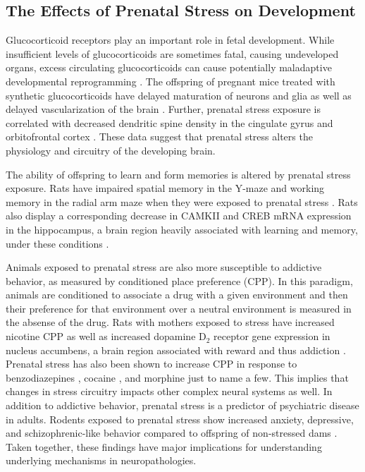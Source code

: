 \documentclass[12pt,twoside]{reedthesis}
\begin{document}
\subsection{The Effects of Prenatal Stress on Development}
Glucocorticoid receptors play an important role in fetal development. While
insufficient levels of glucocorticoids are sometimes fatal, causing undeveloped organs,
excess circulating glucocorticoids can cause potentially maladaptive developmental
reprogramming \citep{2017Nrid}. The offspring of pregnant mice treated with synthetic glucocorticoids
 have delayed maturation of neurons and glia as well as delayed vascularization
 of the brain \citep{gravanis_hormones_2011}. Further, prenatal stress exposure is correlated with
 decreased dendritic spine density in the cingulate gyrus and orbitofrontal
 cortex \citep{murmu_changes_2006}. These data suggest that prenatal stress alters the
 physiology and circuitry of the developing brain.

 The ability of offspring to learn and form memories is altered by prenatal
 stress exposure. Rats have impaired spatial memory in the Y-maze and
 working memory in the radial arm maze when they were exposed to prenatal stress
 \citep{vallee_long-term_1999}. Rats also display a corresponding
 decrease in CAMKII and CREB mRNA expression in the hippocampus, a brain region
 heavily associated with learning and memory, under these
 conditions \citep{sun_prenatal_2017}. 

 Animals exposed to prenatal stress are also more susceptible to addictive
 behavior, as measured by conditioned place preference (CPP). In this paradigm,
 animals are conditioned to associate a drug with a given environment and then
 their preference for that environment over a neutral environment is measured in
 the absense of the drug.
 Rats with mothers exposed to stress have increased nicotine CPP as well as increased dopamine D$_2$ receptor gene expression
 in nucleus accumbens, a brain region associated with reward and thus addiction \citep{said_prenatal_2015}. Prenatal stress has also been shown to
 increase CPP in response to benzodiazepines \citep{lakehayli_prenatal_2015}, cocaine
 \citep{pastor_prenatal_2018}, and morphine \citep{vey_stress_2016} just to name
 a few. This implies that changes in stress circuitry impacts other complex
 neural systems as well. In addition to addictive behavior, prenatal stress is a predictor of psychiatric disease in adults.
 Rodents exposed to prenatal stress show increased anxiety, depressive, and
 schizophrenic-like behavior compared to offspring of non-stressed dams
 \citep{weinstock_prenatal_2017}. Taken together, these findings have major
 implications for understanding underlying mechanisms in neuropathologies.
\end{document}
